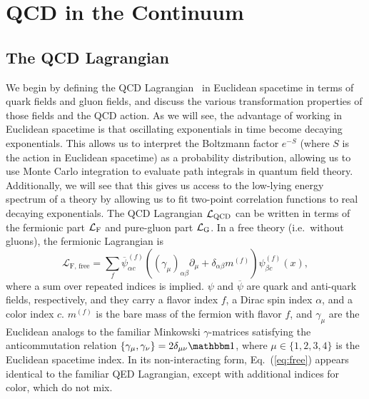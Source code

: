 \section{QCD in the Continuum}
\subsection{The QCD Lagrangian}
We begin by defining the QCD Lagrangian~\cite{Fritzsch:1973pi} in Euclidean spacetime in terms of quark fields and gluon fields, and discuss the various transformation properties of those fields and the QCD action. As we will see, the advantage of working in Euclidean spacetime is that oscillating exponentials in time become decaying exponentials. This allows us to interpret the Boltzmann factor $e^{-S}$ (where $S$ is the action in Euclidean spacetime) as a probability distribution, allowing us to use Monte Carlo integration to evaluate path integrals in quantum field theory. Additionally, we will see that this gives us access to the low-lying energy spectrum of a theory by allowing us to fit two-point correlation functions to real decaying exponentials. The QCD Lagrangian $\mathcal L_{\rm{QCD}}$ can be written in terms of the fermionic part $\mathcal L_{\rm F}$ and pure-gluon part $\mathcal L_{\rm G}$. In a free theory (i.e.\ without gluons), the fermionic Lagrangian is
\begin{equation}\label{eq:free}
    \mathcal L_{\text{F, free}} = \sum_{f} \overline \psi^{(f)}_{\alpha c}\left((\gamma_\mu)_{\alpha\beta} \partial_\mu + \delta_{\alpha\beta}m^{(f)}\right)\psi^{(f)}_{\beta c}(x),
\end{equation}
where a sum over repeated indices is implied. $\psi$ and $\overline \psi$ are quark and anti-quark fields, respectively, and they carry a flavor index $f$, a Dirac spin index $\alpha$, and a color index $c$. $m^{(f)}$ is the bare mass of the fermion with flavor $f$, and $\gamma_\mu$ are the Euclidean analogs to the familiar Minkowski $\gamma$-matrices satisfying the anticommutation relation $\lbrace\gamma_\mu, \gamma_\nu\rbrace=2\delta_{\mu\nu}\mathbbm 1$, where $\mu\in\lbrace 1,2,3,4\rbrace$ is the Euclidean spacetime index. In its non-interacting form, Eq.~(\ref{eq:free}) appears identical to the familiar QED Lagrangian, except with additional indices for color, which do not mix.


